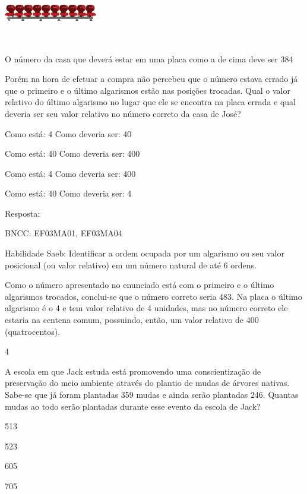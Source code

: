 \begin{escolha}
{\begin{escolha}
{\includegraphics[width=1.60256in,height=1.03072in]{media/image107.png}

O número da casa que deverá estar em uma placa como a de cima deve ser
384

Porém na hora de efetuar a compra não percebeu que o número estava
errado já que o primeiro e o último algarismos estão nas posições
trocadas. Qual o valor relativo do último algarismo no lugar que ele se
encontra na placa errada e qual deveria ser seu valor relativo no número
correto da casa de José?

\begin{escolha}
\item
  Como está: 4 Como deveria ser: 40
\item
  Como está: 40 Como deveria ser: 400
\item
  Como está: 4 Como deveria ser: 400
\item
  Como está: 40 Como deveria ser: 4
\end{escolha}

Resposta:

BNCC: EF03MA01, EF03MA04

Habilidade Saeb: Identificar a ordem ocupada por um algarismo ou seu
valor posicional (ou valor relativo) em um número natural de até 6
ordens.

Como o número apresentado no enunciado está com o primeiro e o último
algarismos trocados, conclui-se que o número correto seria 483. Na placa
o último algarismo é o 4 e tem valor relativo de 4 unidades, mas no
número correto ele estaria na centena comum, possuindo, então, um valor
relativo de 400 (quatrocentos).

\num{4}

A escola em que Jack estuda está promovendo uma conscientização de
preservação do meio ambiente através do plantio de mudas de árvores
nativas. Sabe-se que já foram plantadas 359 mudas e ainda serão
plantadas 246. Quantas mudas ao todo serão plantadas durante esse evento
da escola de Jack?

\begin{escolha}
\item
  513
\item
  523
\item
  605
\item
  705
\end{escolha}

}
\end{escolha}}
\end{escolha}
